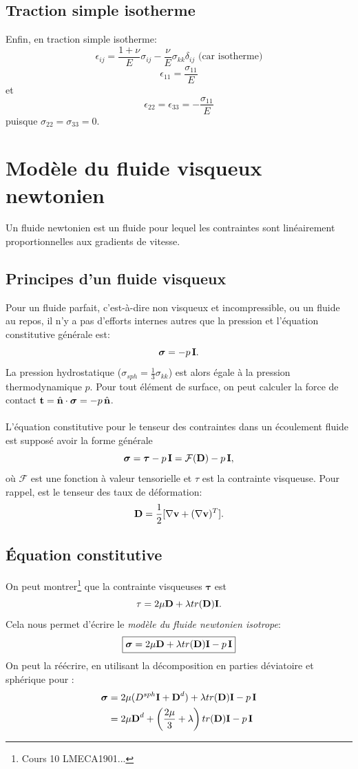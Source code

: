 \subsection{Traction simple isotherme}
Enfin, en traction simple isotherme:
$$\epsilon_{ij}=\frac{1+\nu}{E}\sigma_{ij}-\frac{\nu}{E}\sigma_{kk}\delta_{ij} \text{ (car isotherme)}$$
$$\epsilon_{11}=\frac{\sigma_{11}}{E}$$ et
$$\epsilon_{22}=\epsilon_{33}=-\frac{\sigma_{11}}{E}$$ puisque $\sigma_{22}=\sigma_{33}=0.$

\section{Modèle du fluide visqueux newtonien}
Un fluide newtonien est un fluide pour lequel les contraintes sont linéairement proportionnelles aux gradients de vitesse.
\subsection{Principes d'un fluide visqueux}
Pour un fluide parfait, c'est-à-dire non visqueux et incompressible, ou un fluide au repos, il n'y a pas d'efforts internes autres que la pression et l'équation constitutive générale est:
$$\boldsymbol{\sigma}=-p\,\textbf{I}.$$ La pression hydrostatique ($\sigma_{sph}=\frac{1}{3}\sigma_{kk}$) est alors égale à la pression thermodynamique $p$. Pour tout élément de surface, on peut calculer la force de contact $\textbf{t}=\hat{\textbf{n}}\cdot\boldsymbol{\sigma}=-p\,\hat{\textbf{n}}$.
\paragraph{}
L'équation constitutive pour le tenseur des contraintes dans un écoulement fluide est supposé avoir la forme générale $$\boldsymbol{\sigma}=\boldsymbol{\tau}-p\,\textbf{I}=\mathcal{F}(\textbf{D})-p\,\textbf{I},$$ où $\mathcal{F}$ est une fonction à valeur tensorielle et $\tau$ est la contrainte visqueuse. Pour rappel,  est le tenseur des taux de déformation:
$$\textbf{D}=\frac{1}{2}[\nabla\textbf{v}+(\nabla\textbf{v})^T].$$

\subsection{\'Equation constitutive}
On peut montrer\footnote{Cours 10 LMECA1901...} que la contrainte visqueuses $\boldsymbol{\tau}$ est
$$\tau=2\mu\textbf{D}+\lambda tr(\textbf{D})\textbf{I}.$$ Cela nous permet d'écrire le \emph{modèle du fluide newtonien isotrope}:
$$\boxed{\boldsymbol{\sigma}=2\mu\textbf{D}+\lambda tr(\textbf{D})\textbf{I}-p\,\textbf{I}}$$
On peut la réécrire, en utilisant la décomposition en parties déviatoire et sphérique pour :
\begin{align*}
\boldsymbol{\sigma}&=2\mu(D^{sph}\textbf{I}+\textbf{D}^d)+\lambda tr(\textbf{D})\textbf{I}-p\,\textbf{I}\\
 &=2\mu\textbf{D}^d+\left(\frac{2\mu}{3}+\lambda\right)tr(\textbf{D})\textbf{I}-p\,\textbf{I}
\end{align*}
